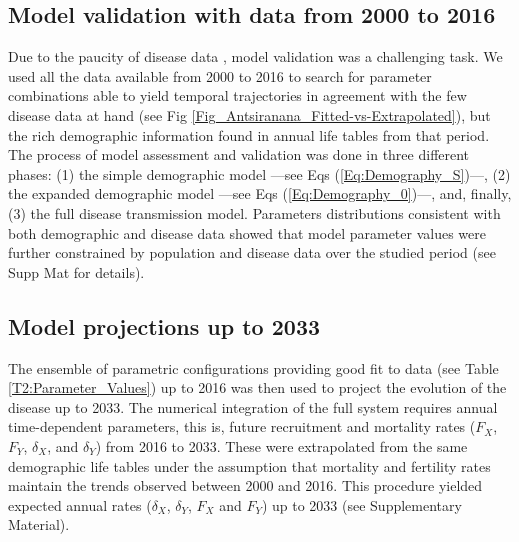 \documentclass[preprint,12pt]{elsarticle}
\begin{document}
\subsection{Model validation with data from 2000 to 2016}
Due to the paucity of disease data \cite{Raberahona2020}, model validation was a challenging task. We used all the data available from 2000 to 2016 to search for parameter combinations able to yield temporal trajectories in agreement with the few disease data at hand (see Fig \ref{Fig_Antsiranana_Fitted-vs-Extrapolated}), but the rich demographic information found in annual life tables from that period. The process of model assessment and validation was done in three different phases: (1) the simple demographic model ---see Eqs (\ref{Eq:Demography_S})---, (2) the expanded demographic model ---see Eqs (\ref{Eq:Demography_0})---, and, finally, (3) the full disease transmission model. Parameters distributions consistent with both demographic and disease data showed that model parameter values were further constrained by population and disease data over the studied period  (see Supp Mat for details). 
\smallskip

 \subsection{Model projections up to 2033}
The ensemble of parametric configurations providing good fit to data (see Table \ref{T2:Parameter_Values}) up to 2016 was then used to project the evolution of the disease up to 2033. The numerical integration of the full system requires annual time-dependent parameters, this is, future recruitment and mortality rates ($F_X$, $F_Y$, $\delta_X$, and $\delta_Y$) from 2016 to 2033. These were extrapolated from the same demographic life tables under the assumption that mortality and fertility rates maintain the trends observed between 2000 and 2016. This procedure yielded expected annual rates ($\delta_X$,  $\delta_Y$, $F_X$ and $F_Y$) up to 2033 (see Supplementary Material). 
\smallskip
\end{document}
